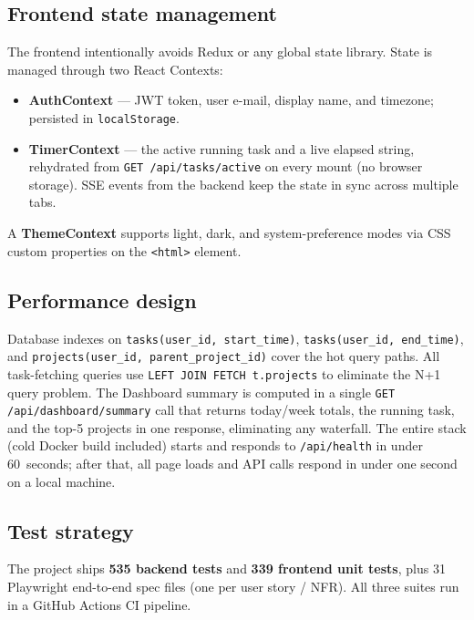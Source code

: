 \documentclass[a4paper, 12pt]{article}
\begin{document}
\subsection{Frontend state management}

The frontend intentionally avoids Redux or any global state library. State is managed through
two React Contexts:
\begin{itemize}
  \item \textbf{AuthContext} --- JWT token, user e-mail, display name, and timezone; persisted
        in \texttt{localStorage}.
  \item \textbf{TimerContext} --- the active running task and a live elapsed string,
        rehydrated from \texttt{GET /api/tasks/active} on every mount (no browser storage).
        SSE events from the backend keep the state in sync across multiple tabs.
\end{itemize}
A \textbf{ThemeContext} supports light, dark, and system-preference modes via CSS custom
properties on the \texttt{<html>} element.

\subsection{Performance design}

Database indexes on \texttt{tasks(user\_id, start\_time)}, \texttt{tasks(user\_id,
end\_time)}, and \texttt{projects(user\_id, parent\_project\_id)} cover the hot query paths.
All task-fetching queries use \texttt{LEFT JOIN FETCH t.projects} to eliminate the N+1 query
problem. The Dashboard summary is computed in a single \texttt{GET /api/dashboard/summary}
call that returns today/week totals, the running task, and the top-5 projects in one
response, eliminating any waterfall. The entire stack (cold Docker build included) starts
and responds to \texttt{/api/health} in under 60~seconds; after that, all page loads and
API calls respond in under one second on a local machine.

\subsection{Test strategy}

The project ships \textbf{535 backend tests} and \textbf{339 frontend unit tests}, plus
31 Playwright end-to-end spec files (one per user story / NFR). All three suites run in a
GitHub Actions CI pipeline.
\end{document}

